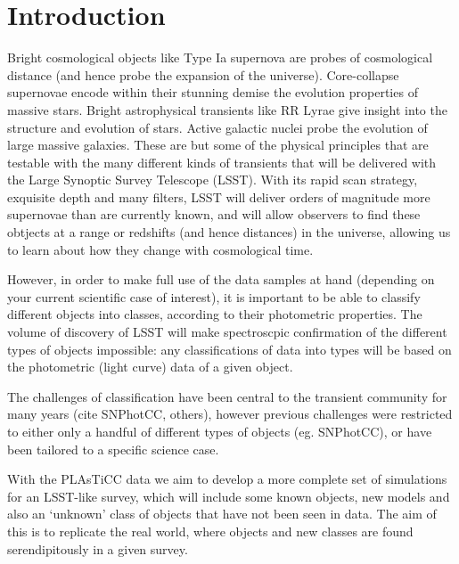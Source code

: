 \section{Introduction}
\label{sec:intro}


Bright cosmological objects like Type Ia supernova are probes of cosmological distance (and hence probe the expansion of the universe). Core-collapse supernovae encode within their stunning demise the evolution properties of massive stars. Bright astrophysical transients like RR Lyrae give insight into the structure and evolution of stars. Active galactic nuclei probe the evolution of large massive galaxies. These are but some of the physical principles that are testable with the many different kinds of transients that will be delivered with the Large Synoptic Survey Telescope (LSST). With its rapid scan strategy, exquisite depth and many filters, LSST will deliver orders of magnitude more supernovae than are currently known, and will allow observers to find these obtjects at a range or redshifts (and hence distances) in the universe, allowing us to learn about how they change with cosmological time.

However, in order to make full use of the data samples at hand (depending on your current scientific case of interest), it is important to be able to classify different objects into classes, according to their photometric properties. The volume of discovery of LSST will make spectroscpic confirmation of the different types of objects impossible: any classifications of data into types will be based on the photometric (light curve) data of a given object.

The challenges of classification have been central to the transient community for many years (cite SNPhotCC, others), however previous challenges were restricted to either only a handful of different types of objects (eg. SNPhotCC), or have been tailored to a specific science case.

With the PLAsTiCC data we aim to develop a more complete set of simulations for an LSST-like survey, which will include some known objects, new models and also an `unknown' class of objects that have not been seen in data. The aim of this is to replicate the real world, where objects and new classes are found serendipitously in a given survey.


